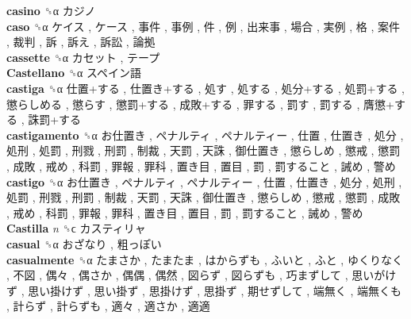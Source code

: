 \textbf{casino} ␝α   カジノ   \\
\textbf{caso} ␝α   ケイス ,  ケース ,  事件 ,  事例 ,  件 ,  例 ,  出来事 ,  場合 ,  実例 ,  格 ,  案件 ,  裁判 ,  訴 ,  訴え ,  訴訟 ,  論拠   \\
\textbf{cassette} ␝α   カセット ,  テープ   \\
\textbf{Castellano} ␝α   スペイン語   \\
\textbf{castiga} ␝α   仕置+する ,  仕置き+する ,  処す ,  処する ,  処分+する ,  処罰+する ,  懲らしめる ,  懲らす ,  懲罰+する ,  成敗+する ,  罪する ,  罰す ,  罰する ,  膺懲+する ,  誅罰+する   \\
\textbf{castigamento} ␝α   お仕置き ,  ペナルティ ,  ペナルティー ,  仕置 ,  仕置き ,  処分 ,  処刑 ,  処罰 ,  刑戮 ,  刑罰 ,  制裁 ,  天罰 ,  天誅 ,  御仕置き ,  懲らしめ ,  懲戒 ,  懲罰 ,  成敗 ,  戒め ,  科罰 ,  罪報 ,  罪科 ,  置き目 ,  置目 ,  罰 ,  罰すること ,  誡め ,  警め   \\
\textbf{castigo} ␝α   お仕置き ,  ペナルティ ,  ペナルティー ,  仕置 ,  仕置き ,  処分 ,  処刑 ,  処罰 ,  刑戮 ,  刑罰 ,  制裁 ,  天罰 ,  天誅 ,  御仕置き ,  懲らしめ ,  懲戒 ,  懲罰 ,  成敗 ,  戒め ,  科罰 ,  罪報 ,  罪科 ,  置き目 ,  置目 ,  罰 ,  罰すること ,  誡め ,  警め   \\
\textbf{Castilla} \emph{n}  ␝ϲ   カスティリャ   \\
\textbf{casual} ␝α   おざなり ,  粗っぽい   \\
\textbf{casualmente} ␝α   たまさか ,  たまたま ,  はからずも ,  ふいと ,  ふと ,  ゆくりなく ,  不図 ,  偶々 ,  偶さか ,  偶偶 ,  偶然 ,  図らず ,  図らずも ,  巧まずして ,  思いがけず ,  思い掛けず ,  思い掛ず ,  思掛けず ,  思掛ず ,  期せずして ,  端無く ,  端無くも ,  計らず ,  計らずも ,  適々 ,  適さか ,  適適   \\
